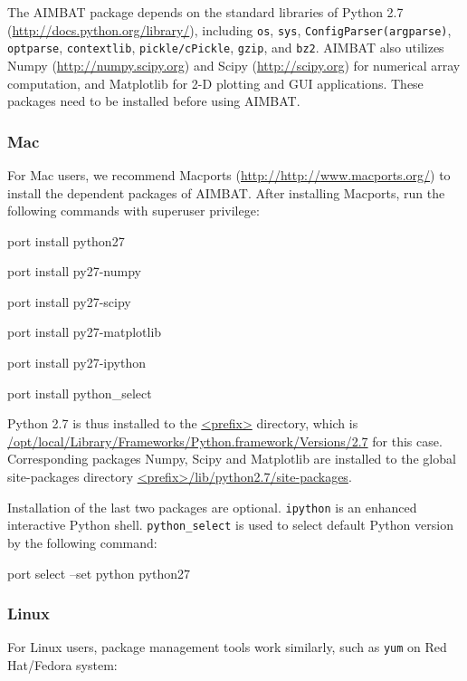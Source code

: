 \documentclass[12pt, titlepage]{article}
\newenvironment{lyxcode}
{\begin{list}{}{
\setlength{\rightmargin}{\leftmargin}
\setlength{\listparindent}{0pt}%
\raggedright
\setlength{\itemsep}{0pt}
\setlength{\parsep}{0pt}
\normalfont\ttfamily}%
 \item[]}
{\end{list}}
\begin{document}
The AIMBAT package depends on the standard libraries of Python 2.7 (\url{http://docs.python.org/library/}), including 
\texttt{os}, 
\texttt{sys}, 
\texttt{ConfigParser(argparse)}, 
\texttt{optparse}, 
\texttt{contextlib}, 
\texttt{pickle/cPickle}, 
\texttt{gzip}, 
and
\texttt{bz2}.
%
AIMBAT also utilizes Numpy (\url{http://numpy.scipy.org}) and Scipy (\url{http://scipy.org}) for numerical array computation, and Matplotlib \citep{matplotlib} for 2-D plotting and GUI applications.
These packages need to be installed before using AIMBAT.

\subsubsection{Mac}

For Mac users, we recommend Macports (\url{http://http://www.macports.org/}) to install the dependent packages of AIMBAT. 
After installing Macports, run the following commands with superuser privilege:

\begin{lyxcode}
port install python27

port install py27-numpy

port install py27-scipy

port install py27-matplotlib

port install py27-ipython

port install python\_select

\end{lyxcode}

Python 2.7 is thus installed to the \url{<prefix>} directory, which is
\url{/opt/local/Library/Frameworks/Python.framework/Versions/2.7} for this case.
Corresponding packages Numpy, Scipy and Matplotlib are installed to the global site-packages directory
\url{<prefix>/lib/python2.7/site-packages}.

Installation of the last two packages are optional. 
\texttt{ipython} is an enhanced interactive Python shell.
\texttt{python\_select} is used to select default Python version by the following command:

\begin{lyxcode}
port select --set python python27
\end{lyxcode}


\subsubsection{Linux}

For Linux users, package management tools work similarly, such as \texttt{yum} on Red Hat/Fedora system:
\end{document}
